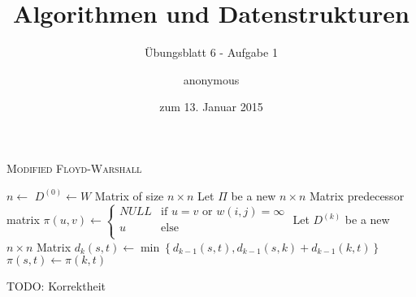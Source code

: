 \documentclass[a4paper]{scrartcl}
\title{Algorithmen und Datenstrukturen}
\subtitle{Übungsblatt 6 - Aufgabe 1}
\author{
    anonymous
}
\date{zum 13. Januar 2015}
\begin{document}
\maketitle

\begin{algorithm}
    \caption{\textsc{Modified Floyd-Warshall}}
    \label{alg:fw}
    \begin{algorithmic}[1]
            \State $n \gets$ 
            \State $D^{(0)} \gets W$
            \Comment Matrix of size $n \times n$
            \State Let $\Pi$ be a new $n \times n$ Matrix
            \Comment predecessor matrix
            \State $\pi(u, v) \gets
            \begin{cases}
                NULL & \text{if } u = v \text{ or } w(i,j) = \infty \\
                u & \text{else} \\
            \end{cases}$
                \State Let $D^{(k)}$ be a new $n \times n$ Matrix
                        \State $d_k(s,t) \gets \min \left\{ d_{k-1}(s,t),
                        d_{k-1}(s,k) + d_{k-1}(k,t) \right\}$
                            \State $\pi(s,t) \gets \pi(k, t)$
                        \EndIf
                    \EndFor
                \EndFor
            \EndFor
        \EndProcedure
    \end{algorithmic}
\end{algorithm}

TODO: Korrektheit
\end{document}
